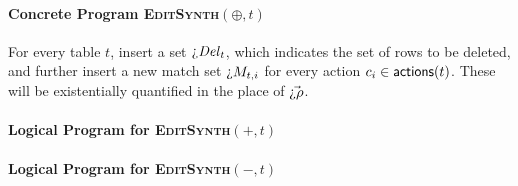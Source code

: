 \paragraph{Concrete Program \textsc{EditSynth}$(\oplus, t)$}

For every table $t$, insert a set $\hole{\mathit{Del}_t}$, which indicates the
set of rows to be deleted, and further insert a new match set $\hole{M_{t,i}}$
for every action $c_i \in \mathsf{actions}(t)$. These will be existentially quantified in
the place of $\vec{\hole{\rho}}$.




\paragraph{Logical Program for \textsc{EditSynth}$(+,t)$}


\paragraph{Logical Program for \textsc{EditSynth}$(-,t)$}


